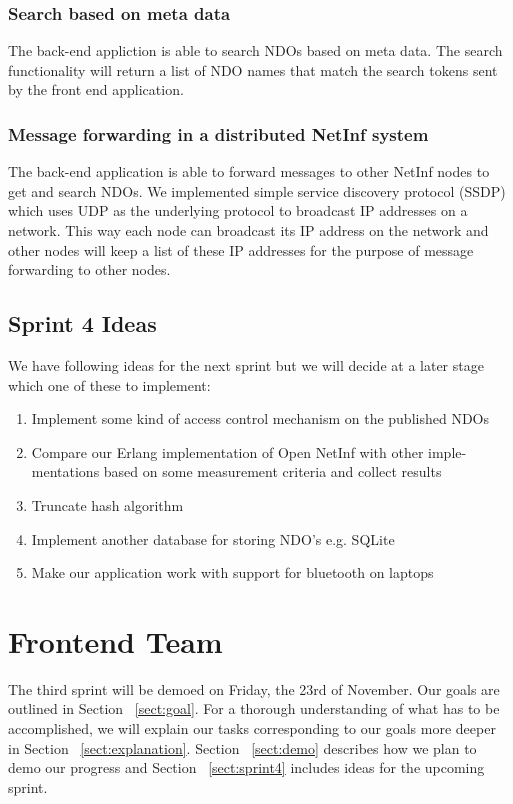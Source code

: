 \documentclass[a4paper,10pt]{article}
\newcommand{\sect}[1]{Section ~\ref{sect:#1}}
\begin{document}
\subsubsection {Search based on meta data}
The back-end appliction is able to search NDOs based on meta data. The search
functionality will return a list of NDO names that match the search tokens sent
by the front end application.
\subsubsection {Message forwarding in a distributed NetInf system}
The back-end application is able to forward messages to other NetInf nodes
to get and search NDOs. We implemented simple service discovery protocol
(SSDP) which uses UDP as the underlying protocol to broadcast IP addresses
on a network. This way each node can broadcast its IP address on the network
and other nodes will keep a list of these IP addresses for the purpose of message
forwarding to other nodes.

\subsection {Sprint 4 Ideas}
We have following ideas for the next sprint but we will decide at a later stage
which one of these to implement:
\begin{enumerate}
\item Implement some kind of access control mechanism on the published NDOs
\item Compare our Erlang implementation of Open NetInf with other imple-
mentations based on some measurement criteria and collect results
\item Truncate hash algorithm
\item Implement another database for storing NDO’s e.g. SQLite
\item Make our application work with support for bluetooth on laptops
\end{enumerate}
\section{Frontend Team}

The third sprint will be demoed on Friday, the 23rd of November.
Our goals are outlined in \sect{goal}. For a thorough understanding of
what has to be accomplished, we will explain our tasks corresponding to our
goals more deeper in \sect{explanation}. \sect{demo} describes how
we plan to demo our progress and \sect{sprint4} includes ideas for the upcoming sprint.
\end{document}
